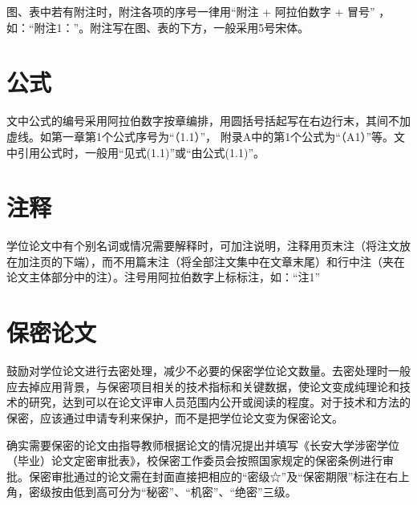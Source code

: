 图、表中若有附注时，附注各项的序号一律用“附注 + 阿拉伯数字 + 冒号” ，如：“附注1：”。附注写在图、表的下方，一般采用5号宋体。

\section{公式}

文中公式的编号采用阿拉伯数字按章编排，用圆括号括起写在右边行末，其间不加虚线。如第一章第1个公式序号为“（1.1）”， 附录A中的第1个公式为“（A1）”等。文中引用公式时，一般用“见式(1.1)”或“由公式(1.1)”。

\section{注释}

学位论文中有个别名词或情况需要解释时，可加注说明，注释用页末注（将注文放在加注页的下端），而不用篇末注（将全部注文集中在文章末尾）和行中注（夹在论文主体部分中的注）。注号用阿拉伯数字上标标注，如：“注1”

\section{保密论文}

鼓励对学位论文进行去密处理，减少不必要的保密学位论文数量。去密处理时一般应去掉应用背景，与保密项目相关的技术指标和关键数据，使论文变成纯理论和技术的研究，达到可以在论文评审人员范围内公开或阅读的程度。对于技术和方法的保密，应该通过申请专利来保护，而不是把学位论文变为保密论文。

确实需要保密的论文由指导教师根据论文的情况提出并填写《长安大学涉密学位（毕业）论文定密审批表》，校保密工作委员会按照国家规定的保密条例进行审批。保密审批通过的论文需在封面直接把相应的“密级☆”及“保密期限”标注在右上角，密级按由低到高可分为“秘密”、“机密”、“绝密”三级。
